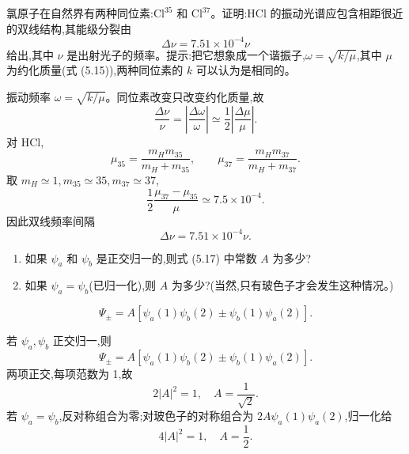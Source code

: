 \begin{question}
氯原子在自然界有两种同位素:$\mathrm{Cl}^{35}$ 和 $\mathrm{Cl}^{37}$。证明:$\mathrm{HCl}$ 的振动光谱应包含相距很近的双线结构,其能级分裂由
\[
\Delta \nu=7.51\times 10^{-4}\nu
\]
给出,其中 $\nu$ 是出射光子的频率。提示:把它想象成一个谐振子,$\omega=\sqrt{k/\mu}$,其中 $\mu$ 为约化质量(式 (5.15)),两种同位素的 $k$ 可以认为是相同的。

\par\smallskip
{}

\begin{solution}

振动频率 $\omega=\sqrt{k/\mu}$。同位素改变只改变约化质量,故
\[
\frac{\Delta\nu}{\nu}=\left|\frac{\Delta\omega}{\omega}\right|
\simeq \frac12\left|\frac{\Delta\mu}{\mu}\right|.
\]
对 HCl,
\[
\mu_{35}=\frac{m_Hm_{35}}{m_H+m_{35}},
\qquad
\mu_{37}=\frac{m_Hm_{37}}{m_H+m_{37}}.
\]
取 $m_H\simeq1,m_{35}\simeq35,m_{37}\simeq37$,
\[
\frac12\frac{\mu_{37}-\mu_{35}}{\mu}\simeq7.5\times10^{-4}.
\]
因此双线频率间隔
\[
\Delta\nu=7.51\times10^{-4}\nu.
\]

\end{solution}
\end{question}

\begin{question}
\begin{enumerate}
\item 如果 $\psi_a$ 和 $\psi_b$ 是正交归一的,则式 (5.17) 中常数 $A$ 为多少?
\item 如果 $\psi_a=\psi_b$(已归一化),则 $A$ 为多少?(当然,只有玻色子才会发生这种情况。)
\end{enumerate}

\par\smallskip
{}\[\Psi_\pm=A[\psi_a(1)\psi_b(2)\pm\psi_b(1)\psi_a(2)].\]

\begin{solution}

若 $\psi_a,\psi_b$ 正交归一,则
\[
\Psi_\pm=A[\psi_a(1)\psi_b(2)\pm\psi_b(1)\psi_a(2)].
\]
两项正交,每项范数为 1,故
\[
2|A|^2=1,
\quad A=\frac1{\sqrt2}.
\]
若 $\psi_a=\psi_b$,反对称组合为零;对玻色子的对称组合为 $2A\psi_a(1)\psi_a(2)$,归一化给
\[
4|A|^2=1,
\quad A=\frac12.
\]

\end{solution}
\end{question}

